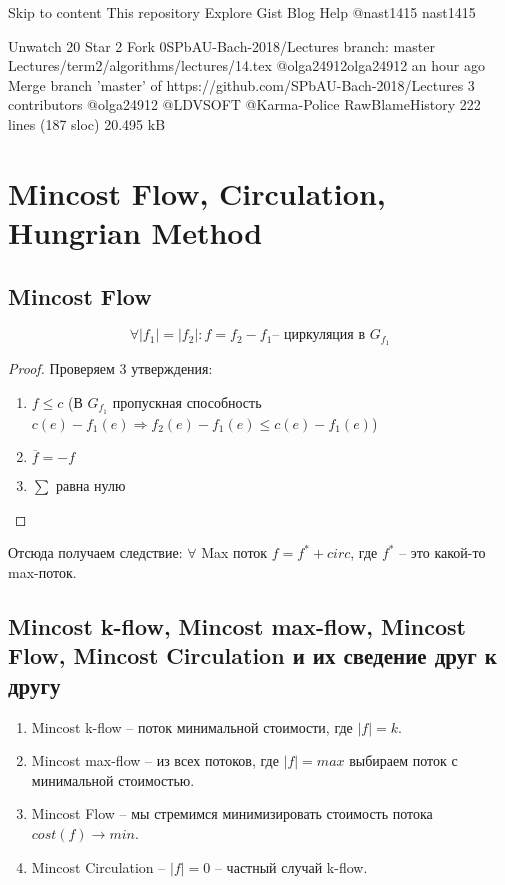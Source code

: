 ﻿Skip to content
This repository  
Explore
Gist
Blog
Help
@nast1415 nast1415
 
 Unwatch 20
  Star 2
 Fork 0SPbAU-Bach-2018/Lectures
 branch: master  Lectures/term2/algorithms/lectures/14.tex
@olga24912olga24912 an hour ago Merge branch 'master' of https://github.com/SPbAU-Bach-2018/Lectures
3 contributors @olga24912 @LDVSOFT @Karma-Police
RawBlameHistory     222 lines (187 sloc)  20.495 kB
\section{Mincost Flow, Circulation, Hungrian Method}

\subsection{Mincost Flow}
\begin{lemma}
	\[ 
		\forall |f_1|=|f_2|\colon f = f_2 - f_1 \text{-- циркуляция в } G_{f_1}
	\]
\end{lemma}
\begin{proof}
	Проверяем 3 утверждения:
	\begin{enumerate}
		\item $f \le c$  (В $G_{f_1}$ пропускная способность $c(e) - f_1(e) \Rightarrow f_2(e) - f_1(e) \le c(e) - f_1(e)$)
		\item $\overline{f} = -f$
		\item $\sum$ равна нулю
	\end{enumerate}
\end{proof}

Отсюда получаем следствие: $\forall$ Max поток $f = f^* + circ$, где $f^*$ -- это какой-то max-поток.


\subsection{Mincost k-flow, Mincost max-flow, Mincost Flow, Mincost Circulation и их сведение друг к другу}
	\begin{enumerate}
		\item Mincost k-flow -- поток минимальной стоимости, где $|f| = k$.
		\item Mincost max-flow -- из всех потоков, где $|f| = max$ выбираем поток с минимальной стоимостью.
		\item Mincost Flow -- мы стремимся минимизировать стоимость потока $cost(f) \to min$.
		\item Mincost Circulation -- $|f| = 0$ -- частный случай k-flow. 
	\end{enumerate}	

